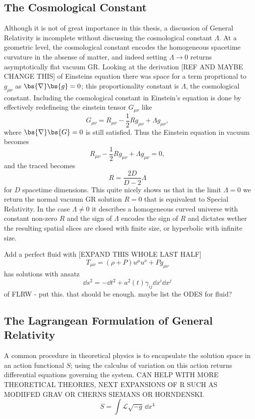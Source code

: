 \subsection{The Cosmological Constant}
Although it is not of great importance in this thesis, a discussion of General Relativity is incomplete without discussing the cosmological constant $\Lambda$. At a geometric level, the cosmological constant encodes the homogeneous spacetime curvature in the absense of matter, and indeed setting $\Lambda\rightarrow 0$ returns asymptotically flat vacuum GR. Looking at the derivation [REF AND MAYBE CHANGE THIS] of Einsteins equation there was space for a term proprtional to $g_{\mu\nu}$ as $\bs{\nabla} \bs{g}=0$; this proportionality constant is $\Lambda$, the cosmological constant. Including the cosmological constant in Einstein's equation is done by effectively redefineing the einstein tensor $G_{\mu\nu}$ like
\begin{equation}
G_{\mu\nu} = R_{\mu\nu}-\frac{1}{2}Rg_{\mu\nu} + \Lambda g_{\mu\nu},
\end{equation}
where $\bs{\nabla} \bs{G} =0$ is still satisfied. Thus the Einstein equation in vacuum becomes
\begin{equation}
R_{\mu\nu}-\frac{1}{2}Rg_{\mu\nu} + \Lambda g_{\mu\nu} = 0,
\end{equation}
and the traced becomes
\begin{equation}
R = \frac{2D}{D-2}\Lambda
\end{equation}
for $D$ spacetime dimensions. This quite nicely shows us that in the limit $\Lambda=0$ we return the normal vacuum GR solution $R=0$ that is equivalent to Special Relativity. In the case $\Lambda\neq 0$ it describes a homogeneous curved universe with constant non-zero $R$ and the sign of $\Lambda$ encodes the sign of $R$ and dictates wether the resulting spatial slices are closed with finite size, or hyperbolic with infinite size.

Add a perfect fluid with [EXPAND THIS WHOLE LAST HALF]
\begin{equation}
T_{\mu\nu} = (\rho+P)u^\mu u^\nu + Pg_{\mu\nu}
\end{equation}
has solutions with ansatz
\begin{equation}
\dd s^2 = -\dd t^2 + a^2(t) \gamma_{ij} \dd x^i \dd x^j
\end{equation}
of FLRW - put this. that should be enough. maybe list the ODES for fluid?


\subsection{The Lagrangean Formulation of General Relativity}
A common procedure in theoretical physics is to encapsulate the solution space in an action functional $S$; using the calculus of variation on this action returns differential equations governing the system. CAN HELP WITH MORE THEORETICAL THEORIES, NEXT EXPANSIONS OF R SUCH AS MODIIFED GRAV OR CHERNS SIEMANS OR HORNDENSKI.
\begin{equation}
S = \int \mathcal{L} \sqrt{-g} \,\dd x^4
\end{equation}

